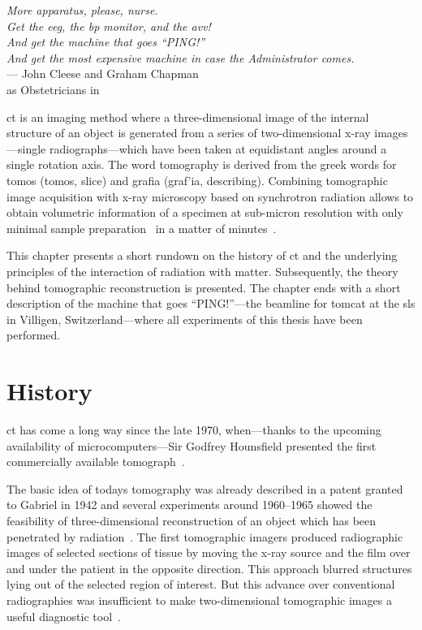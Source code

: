 \acresetall
{}\label{ch:ct}
\begin{flushright}{\slshape More apparatus, please, nurse.\\
				Get the \acs{eeg}, the \acs{bp} monitor, and the \acs{avv}!\\
				And get the machine that goes ``PING!''\\
				And get the most \emph{expensive} machine in case the Administrator comes.} \\ \medskip
	--- John Cleese and Graham Chapman\\as Obstetricians in \citep{TheMeaningOfLife}
\end{flushright}
\vspace{6cm}

\ac{ct} is an imaging method where a three-dimensional image of the internal structure of an object is generated from a series of two-dimensional x-ray images---single radiographs---which have been taken at equidistant angles around a single rotation axis. The word tomography is derived from the greek words for tomos (\greektext tomos\latintext, slice) and grafia (\greektext graf'ia\latintext, describing). Combining tomographic image acquisition with x-ray microscopy based on synchrotron radiation allows to obtain volumetric information of a specimen at sub-micron resolution with only minimal sample preparation~\cite{Stampanoni2006a} in a matter of minutes~\cite{Hintermueller2010}.

This chapter presents a short rundown on the history of \ac{ct} and the underlying principles of the interaction of radiation with matter. Subsequently, the theory behind tomographic reconstruction is presented. The chapter ends with a short description of the machine that goes ``PING!''---the beamline for \ac{tomcat} at the \ac{sls} in Villigen, Switzerland---where all experiments of this thesis have been performed.

\section{History}
\acl{ct} has come a long way since the late 1970, when---thanks to the upcoming availability of microcomputers---Sir Godfrey Hounsfield presented the first commercially available tomograph~\cite{Hounsfield1976a}.

The basic idea of todays tomography was already described in a patent granted to Gabriel \citet{Frank1942} in 1942 and several experiments around 1960--1965 showed the feasibility of three-dimensional reconstruction of an object which has been penetrated by radiation~\cite{Hsieh2003}. The first tomographic imagers produced radiographic images of selected sections of tissue by moving the x-ray source and the film over and under the patient in the opposite direction. This approach blurred structures lying out of the selected region of interest. But this advance over conventional radiographies was insufficient to make two-dimensional tomographic images a useful diagnostic tool~\cite{Robb2003}.

